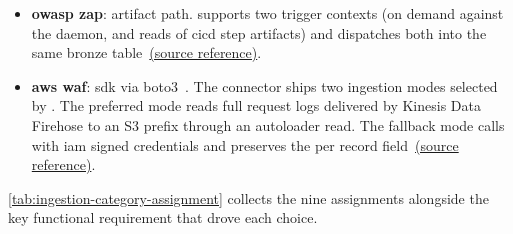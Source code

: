 \begin{itemize}
    \item \textbf{\gls{owasp} \gls{zap}}: artifact path.  supports two trigger contexts (on demand against the daemon, and reads of \gls{cicd} step artifacts) and dispatches both into the same bronze table~\href{https://vkraus.github.io/appsec-mvp/connectors/dast/owasp-zap/}{(source reference)}.

    \item \textbf{\gls{aws} \gls{waf}}: \gls{sdk} via boto3~\parencite{Boto32025}. The connector ships two ingestion modes selected by . The preferred mode reads full request logs delivered by Kinesis Data Firehose to an S3 prefix through an autoloader read. The fallback mode calls  with \gls{iam} signed credentials and preserves the per record  field~\href{https://vkraus.github.io/appsec-mvp/connectors/waf/aws-waf/}{(source reference)}.
\end{itemize}

\autoref{tab:ingestion-category-assignment} collects the nine assignments alongside the key functional requirement that drove each choice.

